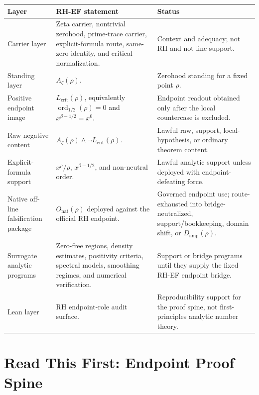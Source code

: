 \documentclass[11pt]{article}
\newcommand{\Az}{A_{\zeta}}
\newcommand{\Lcrit}{L_{\mathrm{crit}}}
\newcommand{\Damp}{D_{\mathrm{amp}}}
\newcommand{\ordhalf}{\operatorname{ord}_{1/2}}
\newcommand{\Onat}{O_{\mathrm{nat}}}
\begin{document}
\begin{longtable}{L{0.23\textwidth}L{0.41\textwidth}L{0.27\textwidth}}
\toprule
\textbf{Layer} & \textbf{RH-EF statement} & \textbf{Status}\\
\midrule
Carrier layer & Zeta carrier, nontrivial zerohood, prime-trace carrier, explicit-formula route, same-zero identity, and critical normalization. & Context and adequacy; not RH and not line support.\\
Standing layer & \(\Az(\rho)\). & Zerohood standing for a fixed point \(\rho\).\\
Positive endpoint image & \(\Lcrit(\rho)\), equivalently \(\ordhalf(\rho)=0\) and \(x^{\beta-1/2}=x^0\). & Endpoint readout obtained only after the local countercase is excluded.\\
Raw negative content & \(\Az(\rho)\wedge\neg\Lcrit(\rho)\). & Lawful raw, support, local-hypothesis, or ordinary theorem content.\\
Explicit-formula support & \(x^\rho/\rho\), \(x^{\beta-1/2}\), and non-neutral order. & Lawful analytic support unless deployed with endpoint-defeating force.\\
Native off-line falsification package & \(\Onat(\rho)\) deployed against the official RH endpoint. & Governed endpoint use; route-exhausted into bridge-neutralized, support/bookkeeping, domain shift, or \(\Damp(\rho)\).\\
Surrogate analytic programs & Zero-free regions, density estimates, positivity criteria, spectral models, smoothing regimes, and numerical verification. & Support or bridge programs until they supply the fixed RH-EF endpoint bridge.\\
Lean layer & RH endpoint-role audit surface. & Reproducibility support for the proof spine, not first-principles analytic number theory.\\
\bottomrule
\end{longtable}

\tableofcontents
\newpage

\section*{Read This First: Endpoint Proof Spine}
\end{document}
